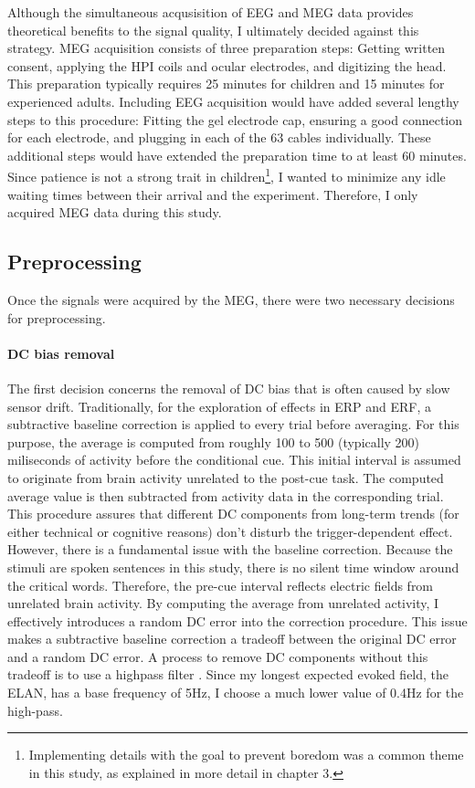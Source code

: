 Although the simultaneous acqusisition of EEG and MEG data provides theoretical benefits to the signal quality, I ultimately decided against this strategy.
MEG acquisition consists of three preparation steps: Getting written consent, applying the HPI coils and ocular electrodes, and digitizing the head.
This preparation typically requires 25 minutes for children and 15 minutes for experienced adults.
Including EEG acquisition would have added several lengthy steps to this procedure: Fitting the gel electrode cap, ensuring a good connection for each electrode, and plugging in each of the 63 cables individually.
These additional steps would have extended the preparation time to at least 60 minutes.
Since patience is not a strong trait in children\footnote{Implementing details with the goal to prevent boredom was a common theme in this study, as explained in more detail in chapter 3.}, I wanted to minimize any idle waiting times between their arrival and the experiment.
Therefore, I only acquired MEG data during this study.

\subsection{Preprocessing}

Once the signals were acquired by the MEG, there were two necessary decisions for preprocessing.

\paragraph{DC bias removal}
The first decision concerns the removal of DC bias that is often caused by slow sensor drift.
Traditionally, for the exploration of effects in ERP and ERF, a subtractive baseline correction is applied to every trial before averaging.
For this purpose, the average is computed from roughly 100 to 500 (typically 200) miliseconds of activity before the conditional cue.
This initial interval is assumed to originate from brain activity unrelated to the post-cue task.
The computed average value is then subtracted from activity data in the corresponding trial.
This procedure assures that different DC components from long-term trends (for either technical or cognitive reasons) don't disturb the trigger-dependent effect.
However, there is a fundamental issue with the baseline correction.
Because the stimuli are spoken sentences in this study, there is no silent time window around the critical words.
Therefore, the pre-cue interval reflects electric fields from unrelated brain activity.
By computing the average from unrelated activity, I effectively introduces a random DC error into the correction procedure.
This issue makes a subtractive baseline correction a tradeoff between the original DC error and a random DC error.
A process to remove DC components without this tradeoff is to use a highpass filter \cite{1.5.highpass}.
Since my longest expected evoked field, the ELAN, has a base frequency of 5Hz, I choose a much lower value of 0.4Hz for the high-pass.

